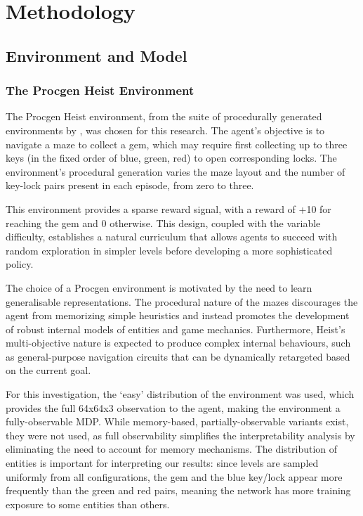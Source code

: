 \chapter{Methodology}
\label{ch:methodology}

\section{Environment and Model}
\label{sec:env_model}
    \subsection{The Procgen Heist Environment}
    \label{subsec:heist_env}
    The Procgen Heist environment, from the suite of procedurally generated environments by \citet{cobbe_2020_leveraging}, was chosen for this research. The agent's objective is to navigate a maze to collect a gem, which may require first collecting up to three keys (in the fixed order of blue, green, red) to open corresponding locks. The environment's procedural generation varies the maze layout and the number of key-lock pairs present in each episode, from zero to three.

    This environment provides a sparse reward signal, with a reward of +10 for reaching the gem and 0 otherwise. This design, coupled with the variable difficulty, establishes a natural curriculum that allows agents to succeed with random exploration in simpler levels before developing a more sophisticated policy.

    The choice of a Procgen environment is motivated by the need to learn generalisable representations. The procedural nature of the mazes discourages the agent from memorizing simple heuristics and instead promotes the development of robust internal models of entities and game mechanics. Furthermore, Heist's multi-objective nature is expected to produce complex internal behaviours, such as general-purpose navigation circuits that can be dynamically retargeted based on the current goal.

    For this investigation, the `easy' distribution of the environment was used, which provides the full 64x64x3 observation to the agent, making the environment a fully-observable MDP. While memory-based, partially-observable variants exist, they were not used, as full observability simplifies the interpretability analysis by eliminating the need to account for memory mechanisms. The distribution of entities is important for interpreting our results: since levels are sampled uniformly from all configurations, the gem and the blue key/lock appear more frequently than the green and red pairs, meaning the network has more training exposure to some entities than others.

